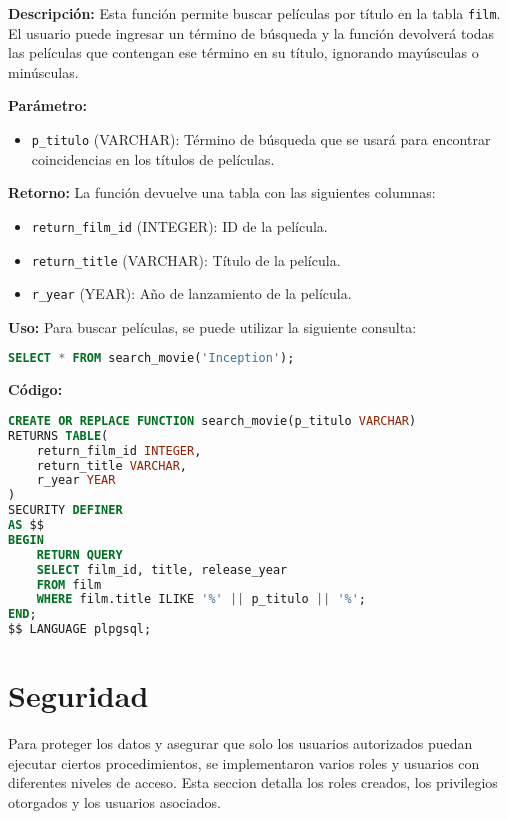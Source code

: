 \documentclass{article}
\begin{document}
\textbf{Descripción:}  
Esta función permite buscar películas por título en la tabla \texttt{film}. El usuario puede ingresar un término de búsqueda y la función devolverá todas las películas que contengan ese término en su título, ignorando mayúsculas o minúsculas.

\textbf{Parámetro:}
\begin{itemize}
    \item \texttt{p\_titulo} (VARCHAR): Término de búsqueda que se usará para encontrar coincidencias en los títulos de películas.
\end{itemize}

\textbf{Retorno:}  
La función devuelve una tabla con las siguientes columnas:
\begin{itemize}
    \item \texttt{return\_film\_id} (INTEGER): ID de la película.
    \item \texttt{return\_title} (VARCHAR): Título de la película.
    \item \texttt{r\_year} (YEAR): Año de lanzamiento de la película.
\end{itemize}

\textbf{Uso:}
Para buscar películas, se puede utilizar la siguiente consulta:

\begin{lstlisting}[language=SQL]
SELECT * FROM search_movie('Inception');
\end{lstlisting}

\textbf{Código:}
\begin{lstlisting}[language=SQL]
CREATE OR REPLACE FUNCTION search_movie(p_titulo VARCHAR)
RETURNS TABLE(
    return_film_id INTEGER,      
    return_title VARCHAR,        
    r_year YEAR                  
) 
SECURITY DEFINER
AS $$
BEGIN
    RETURN QUERY
    SELECT film_id, title, release_year  
    FROM film  
    WHERE film.title ILIKE '%' || p_titulo || '%';  
END;
$$ LANGUAGE plpgsql;
\end{lstlisting}

\newpage
\section{Seguridad}

Para proteger los datos y asegurar que solo los usuarios autorizados puedan ejecutar ciertos procedimientos, se implementaron varios roles y usuarios con diferentes niveles de acceso. Esta seccion detalla los roles creados, los privilegios otorgados y los usuarios asociados.
\end{document}
